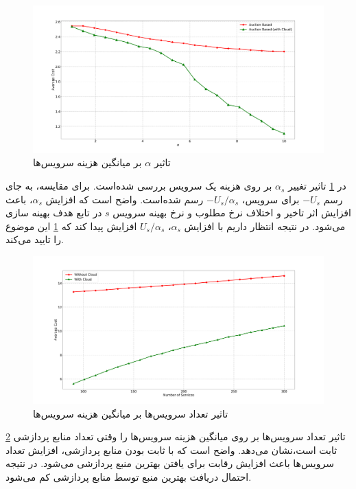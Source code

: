     \begin{figure}
      \centerline{\includegraphics[width=17cm]{graphics/one_to_one/sim_3}}
      \caption{تاثیر $\alpha$ بر میانگین هزینه سرویس‌ها}
      \label{fig:ono_to_one:sim3}
    \end{figure}

    در \cref{fig:ono_to_one:sim3} تاثیر تغییر $\alpha_s$ بر روی هزینه یک سرویس‌ بررسی شده‌است.
    برای مقایسه، به جای رسم $-U_s$ برای سرویس، $-U_s/\alpha_s$ رسم شده‌است.
    واضح است که افزایش $\alpha_s$، باعث افزایش اثر تاخیر و اختلاف نرخ مطلوب و نرخ بهینه سرویس $s$ در تابع هدف بهینه سازی می‌شود.
    در نتیجه انتظار داریم با افزایش $\alpha_s$، $U_s/\alpha_s$ افزایش پیدا کند که \cref{fig:ono_to_one:sim3} این موضوع را تایید می‌کند.

    \begin{figure}
      \centerline{\includegraphics[width=17cm]{graphics/one_to_one/sim_4}}
      \caption{تاثیر تعداد سرویس‌ها بر میانگین هزینه سرویس‌ها}
      \label{fig:ono_to_one:sim4}
    \end{figure}

    \cref{fig:ono_to_one:sim4} تاثیر تعداد سرویس‌ها بر روی میانگین هزینه سرویس‌ها را وقتی تعداد منابع پردازشی ثابت است،‌نشان می‌دهد.
    واضح است که با ثابت بودن منابع پردازشی، افزایش تعداد سرویس‌ها باعث افزایش رقابت برای یافتن بهترین منبع پردازشی می‌شود.
    در نتیجه احتمال دریافت بهترین منبع توسط منابع پردازشی کم‌ می‌شود.

